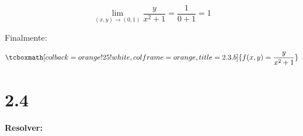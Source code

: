 \documentclass{article}
\begin{document}
\begin{equation}
\lim_{(x,y) \rightarrow (0,1)} \frac{y}{x^2 + 1} = \frac{1}{0+1} = 1
\end{equation}

Finalmente:

\begin{equation}
\tcboxmath[colback=orange!25!white,colframe=orange,title=2.3.b]
{ f(x,y) = \frac{y}{x^2 + 1} }
\end{equation}

\section*{2.4}
\label{sec:2.4}

\textbf{Resolver:} 
\end{document}

